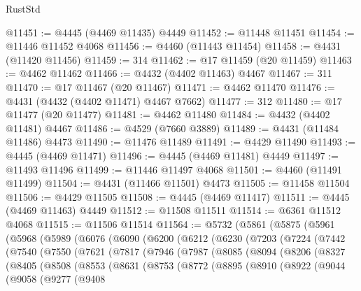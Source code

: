 \begin{lexlean}{RustStd}
\begin{coremodule}
@11451 := @4445 (@4469 @11435) @4449
@11452 := @11448 @11451
@11454 := @11446 @11452 @4068
@11456 := @4460 (@11443 @11454)
@11458 := @4431 (@11420 @11456)
@11459 := 314
@11462 := @17 @11459 (@20 @11459)
@11463 := @4462 @11462
@11466 := @4432 (@4402 @11463) @4467
@11467 := 311
@11470 := @17 @11467 (@20 @11467)
@11471 := @4462 @11470
@11476 := @4431 (@4432 (@4402 @11471) @4467 @7662)
@11477 := 312
@11480 := @17 @11477 (@20 @11477)
@11481 := @4462 @11480
@11484 := @4432 (@4402 @11481) @4467
@11486 := @4529 (@7660 @3889)
@11489 := @4431 (@11484 @11486) @4473
@11490 := @11476 @11489
@11491 := @4429 @11490
@11493 := @4445 (@4469 @11471)
@11496 := @4445 (@4469 @11481) @4449
@11497 := @11493 @11496
@11499 := @11446 @11497 @4068
@11501 := @4460 (@11491 @11499)
@11504 := @4431 (@11466 @11501) @4473
@11505 := @11458 @11504
@11506 := @4429 @11505
@11508 := @4445 (@4469 @11417)
@11511 := @4445 (@4469 @11463) @4449
@11512 := @11508 @11511
@11514 := @6361 @11512 @4068
@11515 := @11506 @11514
@11564 := @5732
    (@5861
      (@5875
        (@5961
          (@5968
            (@5989
              (@6076
                (@6090
                  (@6200
                    (@6212
                      (@6230
                        (@7203
                          (@7224
                            (@7442
                              (@7540
                                (@7550
                                  (@7621
                                    (@7817
                                      (@7946
                                        (@7987
                                          (@8085
                                            (@8094
                                              (@8206
                                                (@8327
                                                  (@8405
                                                    (@8508
                                                      (@8553
                                                        (@8631
                                                          (@8753
                                                            (@8772
                                                              (@8895
                                                                (@8910
                                                                  (@8922
                                                                    (@9044
                                                                      (@9058
                                                                        (@9277
                                                                          (@9408

\end{coremodule}
\end{lexlean}
